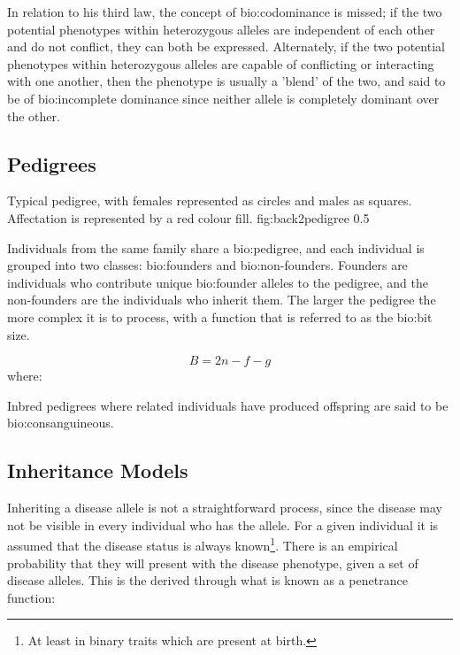 In relation to his third law, the concept of \gls{bio:codominance} is missed; if the two potential phenotypes within heterozygous alleles are independent of each other and do not conflict, they can both be expressed. Alternately, if the two potential phenotypes within heterozygous alleles are capable of conflicting or interacting with one another, then the phenotype is usually a 'blend' of the two, and said to be of \gls{bio:incomplete dominance} since neither allele is completely dominant over the other.


\subsection{Pedigrees}

	{Typical pedigree, with females represented as circles and males as squares. Affectation is represented by a red colour fill.}
	{fig:back2pedigree}
	{0.5}

Individuals from the same family share a \gls{bio:pedigree}, and each individual is grouped into two classes: \gls{bio:founders} and \gls{bio:non-founders}. 
Founders are individuals who contribute unique \gls{bio:founder alleles} to the pedigree, and the non-founders are the individuals who inherit them.
The larger the pedigree the more complex it is to process, with a function that is referred to as the \gls{bio:bit size}.

\begin{equation}
\label{eqn:bitsize}
B = 2n -f -g
\end{equation}
where:

\begin{description}
\end{description}

Inbred pedigrees where related individuals have produced offspring are said to be \gls{bio:consanguineous}.


\subsection{Inheritance Models}

Inheriting a disease allele is not a straightforward process, since the disease may not be visible in every individual who has the allele. For a given individual it is assumed that the disease status is always known\footnote{At least in binary traits which are present at birth.}.  There is an empirical probability that they will present with the disease phenotype, given a set of disease alleles. This is the derived through what is known as a penetrance function:


